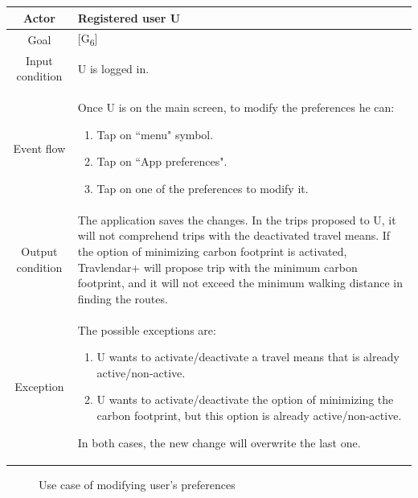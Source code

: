 \documentclass[12pt,titlepage]{article}
\begin{document}
\begin{tabular}{cp{10cm}} 
Actor&Registered user U \\ \hline 
Goal& {[G\textsubscript{6}]}\\ \hline
Input condition&U is logged in.\\ \hline
Event flow&Once U is on the main screen, to modify the preferences he can:
\begin{enumerate}
\item Tap on ``menu" symbol.
\item Tap on ``App preferences".
\item Tap on one of the preferences to modify it.
\end{enumerate} 
\\ \hline
Output condition& The application saves the changes. In the trips proposed to U, it will not comprehend trips with the deactivated travel means. If the option of minimizing carbon footprint is activated, Travlendar+ will propose trip with the minimum carbon footprint, and it will not exceed the minimum walking distance in finding the routes. \\ \hline
Exception& The possible exceptions are:
\begin{enumerate}
\item U wants to activate/deactivate a travel means that is already active/non-active.
\item U wants to activate/deactivate the option of minimizing the carbon footprint, but this option is already active/non-active.
\end{enumerate}
In both cases, the new change will overwrite the last one.\\ \hline 

\end{tabular}
\pagebreak 
\begin{figure}
\centering
{}
\caption{Use case of modifying user's preferences}
\end{figure}
\end{document}
